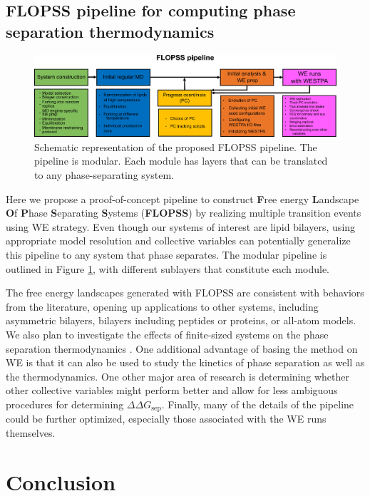 \documentclass{biophys-new}
\begin{document}
\subsection*{FLOPSS pipeline for computing phase separation thermodynamics}

\begin{figure}[hbt!]
    \centering
    \includegraphics[width=6.5in]{Figures/Main/9/placeholder.jpg}
    \caption{Schematic representation of the proposed FLOPSS pipeline. The pipeline is modular. Each module has layers that can be translated to any phase-separating system.}
    \label{figs8:view}
\end{figure}

Here we propose a proof-of-concept pipeline to construct \textbf{F}ree energy \textbf{L}andscape \textbf{O}f \textbf{P}hase \textbf{S}eparating \textbf{S}ystems (\textbf{FLOPSS}) by realizing multiple transition events using WE strategy.
Even though our systems of interest are lipid bilayers, using appropriate model resolution and collective variables can potentially generalize this pipeline to any system that phase separates.
The modular pipeline is outlined in Figure \ref{figs8:view}, with different sublayers that constitute each module.

The free energy landscapes generated with FLOPSS are consistent with behaviors from the literature, opening up applications to other systems, including asymmetric bilayers, bilayers including peptides or proteins, or all-atom models. We also plan to investigate the effects of finite-sized systems on the phase separation thermodynamics \cite{Pantelopulos2017}. One additional advantage of basing the method on WE is that it can also be used to study the kinetics of phase separation as well as the thermodynamics. One other major area of research is determining whether other collective variables might perform better and allow for less ambiguous procedures for determining $\Delta\Delta G_\text{sep}$. Finally, many of the details of the pipeline could be further optimized, especially those associated with the WE runs themselves.

\section*{Conclusion}
\end{document}
